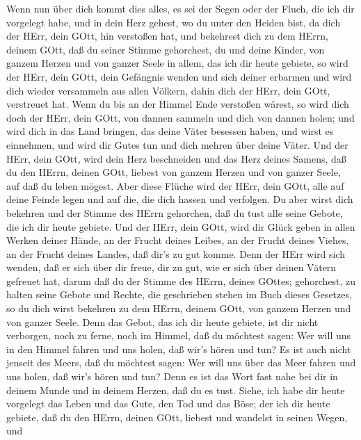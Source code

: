  Wenn nun über dich kommt dies alles, es sei der Segen oder
der Fluch, die ich dir vorgelegt habe, und in dein Herz gehest, wo du
unter den Heiden bist, da dich der HErr, dein GOtt, hin verstoßen hat,
 und bekehrest dich zu dem HErrn, deinem GOtt, daß du seiner
Stimme gehorchest, du und deine Kinder, von ganzem Herzen und von ganzer
Seele in allem, das ich dir heute gebiete,  so wird der
HErr, dein GOtt, dein Gefängnis wenden und sich deiner erbarmen und wird
dich wieder versammeln aus allen Völkern, dahin dich der HErr, dein
GOtt, verstreuet hat.  Wenn du bis an der Himmel Ende
verstoßen wärest, so wird dich doch der HErr, dein GOtt, von dannen
sammeln und dich von dannen holen;  und wird dich in das
Land bringen, das deine Väter besessen haben, und wirst es einnehmen,
und wird dir Gutes tun und dich mehren über deine Väter. 
Und der HErr, dein GOtt, wird dein Herz beschneiden und das Herz deines
Samens, daß du den HErrn, deinen GOtt, liebest von ganzem Herzen und von
ganzer Seele, auf daß du leben mögest.  Aber diese Flüche
wird der HErr, dein GOtt, alle auf deine Feinde legen und auf die, die
dich hassen und verfolgen.  Du aber wirst dich bekehren und
der Stimme des HErrn gehorchen, daß du tust alle seine Gebote, die ich
dir heute gebiete.  Und der HErr, dein GOtt, wird dir Glück
geben in allen Werken deiner Hände, an der Frucht deines Leibes, an der
Frucht deines Viehes, an der Frucht deines Landes, daß dir's zu gut
komme. Denn der HErr wird sich wenden, daß er sich über dir freue, dir
zu gut, wie er sich über deinen Vätern gefreuet hat,  darum
daß du der Stimme des HErrn, deines GOttes; gehorchest, zu halten seine
Gebote und Rechte, die geschrieben stehen im Buch dieses Gesetzes, so du
dich wirst bekehren zu dem HErrn, deinem GOtt, von ganzem Herzen und von
ganzer Seele.  Denn das Gebot, das ich dir heute gebiete,
ist dir nicht verborgen, noch zu ferne,  noch im Himmel,
daß du möchtest sagen: Wer will uns in den Himmel fahren und uns holen,
daß wir's hören und tun?  Es ist auch nicht jenseit des
Meers, daß du möchtest sagen: Wer will uns über das Meer fahren und uns
holen, daß wir's hören und tun?  Denn es ist das Wort fast
nahe bei dir in deinem Munde und in deinem Herzen, daß du es tust.
 Siehe, ich habe dir heute vorgelegt das Leben und das
Gute, den Tod und das Böse;  der ich dir heute gebiete, daß
du den HErrn, deinen GOtt, liebest und wandelst in seinen Wegen, und
